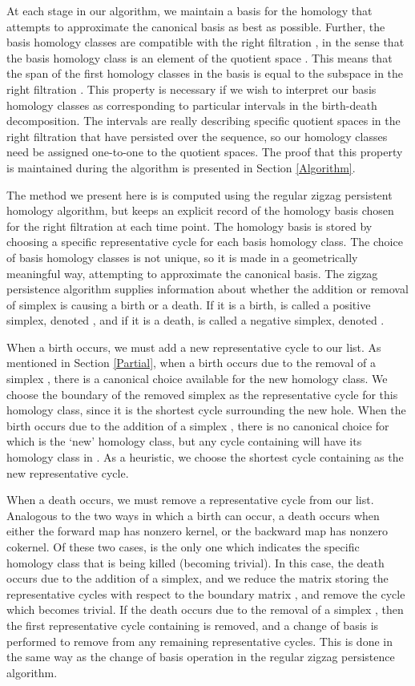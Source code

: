 \documentclass[12pt]{article}
\begin{document}
At each stage in our algorithm, we maintain a basis for the homology that attempts to approximate the canonical basis as best as possible. Further, the basis homology classes are compatible with the right filtration , in the sense that the   basis homology class is an element of the  quotient space . This means that the span of the first  homology classes in the basis is equal to the  subspace  in the right filtration . This property is necessary if we wish to interpret our basis homology classes as corresponding to particular intervals in the birth-death decomposition. The intervals are really describing specific quotient spaces in the right filtration that have persisted over the sequence, so our homology classes need be assigned one-to-one to the quotient spaces. The proof that this property is maintained during the algorithm is presented in Section \ref{Algorithm}.

The method we present here is is computed using the regular zigzag persistent homology algorithm, but keeps an explicit record of the homology basis chosen for the right filtration at each time point. The homology basis is stored by choosing a specific representative cycle for each basis homology class. The choice of basis homology classes is not unique, so it is made in a geometrically meaningful way, attempting to approximate the canonical basis. The zigzag persistence algorithm supplies information about whether the addition or removal of simplex  is causing a birth or a death. If it is a birth,  is called a positive simplex, denoted , and if it is a death,  is called a negative simplex, denoted .

When a birth occurs, we must add a new representative cycle to our list. As mentioned in Section \ref{Partial}, when a birth occurs due to the removal of a simplex , there is a canonical choice available for the new homology class. We choose the boundary  of the removed simplex as the representative cycle for this homology class, since it is the shortest cycle surrounding the new hole. When the birth occurs due to the addition of a simplex , there is no canonical choice for which is the `new' homology class, but any cycle containing  will have its homology class in . As a heuristic, we choose the shortest cycle containing  as the new representative cycle.

When a death occurs, we must remove a representative cycle from our list. Analogous to the two ways in which a birth can occur, a death occurs when either the forward map  has nonzero kernel, or the backward map  has nonzero cokernel. Of these two cases,  is the only one which indicates the specific homology class  that is being killed (becoming trivial). In this case, the death occurs due to the addition of a simplex, and we reduce the matrix storing the representative cycles with respect to the boundary matrix , and remove the cycle which becomes trivial. If the death occurs due to the removal of a simplex , then the first representative cycle containing  is removed, and a change of basis is performed to remove  from any remaining representative cycles. This is done in the same way as the change of basis operation in the regular zigzag persistence algorithm.
\end{document}
